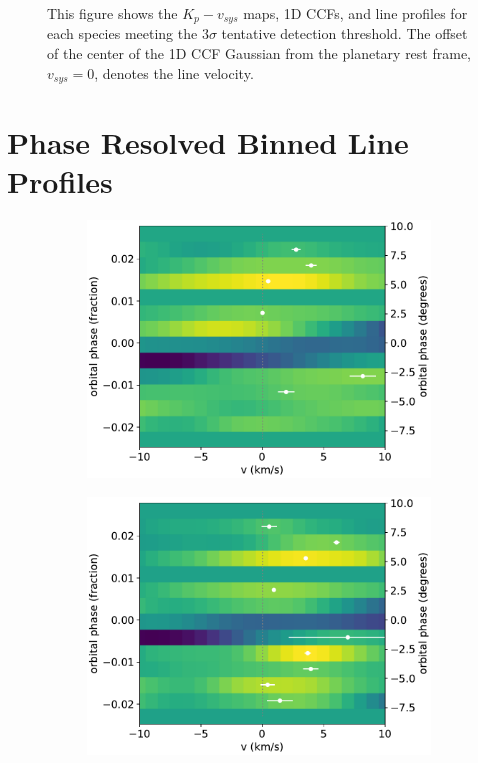 \documentclass[twocolumn]{aastex631}
\begin{document}
\begin{figure}[ht!]
            \caption{This figure shows the $K_p-v_{sys}$ maps, 1D CCFs, and line profiles for each species meeting the ${3\sigma}$ tentative detection threshold. The offset of the center of the 1D CCF Gaussian from the planetary rest frame, ${v_{sys}}=0$, denotes the line velocity.}
            \label{fig:Detections}
        \end{figure}
        
        \section{Phase Resolved Binned Line Profiles}
            \begin{figure}[ht!] \label{fig:Dynamics}
                 \begin{subfigure}[b]{0.5\textwidth}
                    \includegraphics[width=\textwidth]{plots-updated/line-velocity/binned/pcolor/points/KELT-20b.Fe.phase-binned+RVs.pdf}
                    \caption{}\label{fig:wind-chars-Fe-combined}
                \end{subfigure}
                 \begin{subfigure}[b]{0.5\textwidth}
                    \includegraphics[width=\textwidth]{plots-updated/line-velocity/binned/pcolor/points/KELT-20b.Fe+.phase-binned+RVs.pdf}

\end{subfigure}
\end{figure}
\end{document}
